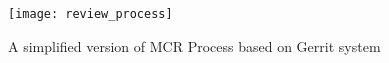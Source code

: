 %
%
%


\begin{figure}[!t]
\centering
\texttt{[image: review\_process]}
\caption{A simplified version of MCR Process based on Gerrit system}
\label{fig:process}
\end{figure}
